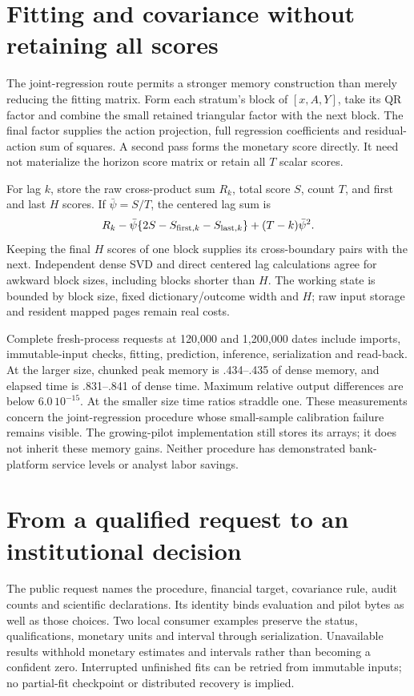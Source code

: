 

\section{Fitting and covariance without retaining all scores}
\label{v9:execution}

The joint-regression route permits a stronger memory construction than merely
reducing the fitting matrix. Form each stratum's block of $[x,A,Y]$, take its QR
factor and combine the small retained triangular factor with the next block.
The final factor supplies the action projection, full regression coefficients
and residual-action sum of squares. A second pass forms the monetary score
directly. It need not materialize the horizon score matrix or retain all $T$
scalar scores.

For lag $k$, store the raw cross-product sum $R_k$, total score $S$, count $T$,
and first and last $H$ scores. If $\bar\psi=S/T$, the centered lag sum is
\[
 R_k-\bar\psi\{2S-S_{{\rm first},k}-S_{{\rm last},k}\}
       +(T-k)\bar\psi^2.
\]
Keeping the final $H$ scores of one block supplies its cross-boundary pairs
with the next. Independent dense SVD and direct centered lag calculations
agree for awkward block sizes, including blocks shorter than $H$. The
working state is bounded by block size, fixed dictionary/outcome width and
$H$; raw input storage and resident mapped pages remain real costs.

Complete fresh-process requests at 120,000 and 1,200,000 dates include imports,
immutable-input checks, fitting, prediction, inference, serialization and
read-back. At the larger size, chunked peak memory is .434--.435 of dense
memory, and elapsed time is .831--.841 of dense time. Maximum relative
output differences are below $6.0\,10^{-15}$. At the smaller size time ratios
straddle one. These measurements concern the joint-regression procedure whose
small-sample calibration failure remains visible. The growing-pilot
implementation still stores its arrays; it does not inherit these memory gains.
Neither procedure has demonstrated bank-platform service levels or analyst
labor savings.

\section{From a qualified request to an institutional decision}
\label{v9:external}

The public request names the procedure, financial target, covariance rule,
audit counts and scientific declarations. Its identity binds evaluation and
pilot bytes as well as those choices. Two local consumer examples preserve
the status, qualifications, monetary units and interval through serialization.
Unavailable results withhold monetary estimates and intervals rather than
becoming a confident zero. Interrupted unfinished fits can be retried from
immutable inputs; no partial-fit checkpoint or distributed recovery is implied.

